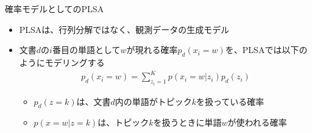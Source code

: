 \documentclass[aspectratio=169,unicode,dvipdfmx,14pt]{beamer}
\begin{document}
\begin{frame}{確率モデルとしてのPLSA}
\begin{itemize}
\item PLSAは、行列分解ではなく、観測データの生成モデル
\item 文書$d$の$i$番目の単語として$w$が現れる確率$p_d(x_i=w)$を、PLSAでは以下のようにモデリングする
\begin{align}
p_d(x_i=w) = \sum_{z_i=1}^K p(x_i=w|z_i) p_d(z_i)
\end{align}
\begin{itemize}
\item $p_d(z=k)$は、文書$d$内の単語がトピック$k$を扱っている確率
\item $p(x=w|z=k)$は、トピック$k$を扱うときに単語$w$が使われる確率
\end{itemize}
\end{itemize}

\end{frame}
\end{document}
